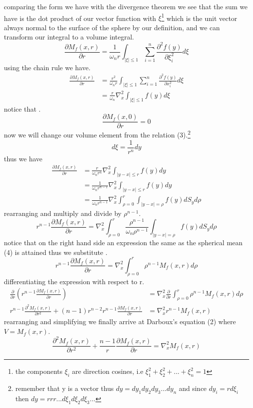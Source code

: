 \documentclass[]{article}
\begin{document}
comparing the form we have with the divergence theorem we see that the sum we have is the dot product of our vector function with $\xi$\footnote{the components $\xi_i$ are direction cosines, i.e $\xi_{1}^{2}+\xi_{2}^{2}+...+\xi_{n}^{2} = 1$} which is the unit vector always normal to the surface of the sphere by our definition, and we can transform our integral to a volume integral.
\[
    \frac{\partial M_f (x,r)}{\partial r} = \frac{1}{\omega_n r} \int_{|\xi|\leq 1} \sum_{i=1}^{n} \frac{\partial^2 f(y)}{\partial \xi_{i}^{2}} d\xi    
\]
using the chain rule we have.
\begin{align*}
\frac{\partial M_f (x,r)}{\partial r} &= \frac{r^2}{\omega_n r} \int_{|\xi|\leq 1} \sum_{i=1}^{n} \frac{\partial^2 f(y)}{\partial x_{i}^{2}} d\xi
\\
&=\frac{r}{\omega_n} \nabla_{x}^{2} \int_{|\xi|\leq 1} f(y)d\xi
\end{align*}
notice that .
\[
    \frac{\partial M_f (x,0)}{\partial r} = 0    
\]
now we will change our volume element from the relation (3).\footnote{remember that y is a vector thus $dy = dy_1 dy_2 dy_3 ...dy_n$ and since $dy_i = rd\xi_i$ then $dy = rrr...d\xi_1 d\xi_2 d\xi_3 ...$}
\[
    d\xi = \frac{1}{r^n}dy    
\]
thus we have 
\begin{align*}
\frac{\partial M_f (x,r)}{\partial r} &= \frac{r}{\omega_n r^n} \nabla_{x}^{2} \int_{|y-x|\leq r} f(y)dy
\\
&= \frac{1}{\omega_n r^{n-1}} \nabla_{x}^{2} \int_{|y-x|\leq r} f(y)dy
\\
&= \frac{1}{\omega_n r^{n-1}} \nabla_{x}^{2} \int_{\rho = 0}^{r} \int_{|y-x| = \rho} f(y)dS_y d\rho
\end{align*}
rearranging and multiply and divide by $\rho^{n-1}$.
\[
    r^{n-1} \frac{\partial M_f (x,r)}{\partial r} =  \nabla_{x}^{2}\int_{\rho = 0}^{r} \frac{\rho^{n-1}}{\omega_n \rho^{n-1}} \int_{|y-x|= \rho}f(y)dS_y d\rho    
\]
notice that on the right hand side an expression the same as the spherical mean (4) is attained thus we substitute .
\[
    r^{n-1} \frac{\partial M_f (x,r)}{\partial r} = \nabla_{x}^{2}\int_{\rho = 0}^{r} \rho^{n-1} M_{f}(x,r) d\rho    
\]
differentiating the expression with respect to r.
\begin{align*}
\frac{\partial}{\partial r}\left( r^{n-1} \frac{\partial M_f (x,r)}{\partial r}\right) &= \nabla_{x}^{2} \frac{\partial}{\partial r}\int_{\rho = 0}^{r} \rho^{n-1} M_{f}(x,r) d\rho
\\
r^{n-1} \frac{\partial^2 M_f (x,r)}{\partial r^2} + (n-1)r^{n-2}r^{n-1} \frac{\partial M_f (x,r)}{\partial r} &= \nabla_{x}^{2} r^{n-1} M_f (x,r)
\end{align*}
rearranging and simplifying we finally arrive at Darboux's equation (2) where $ V=M_f (x,r) $.
\[
    \frac{\partial^2 M_f (x,r)}{\partial r^2} + \frac{n-1}{r} \frac{\partial M_f (x,r)}{\partial r} = \nabla_{x}^{2} M_f (x,r)    
\]
\end{document}

